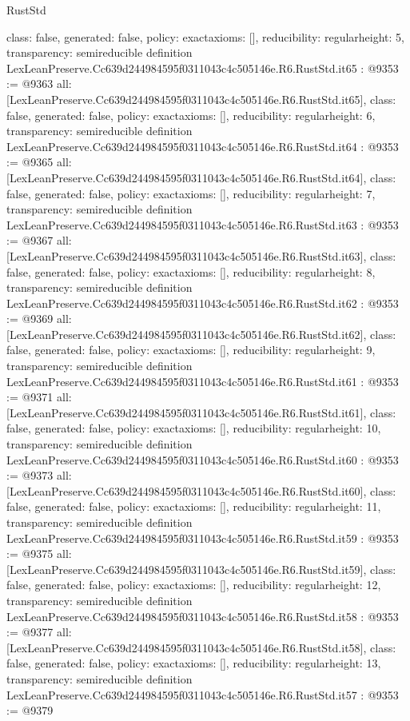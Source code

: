\begin{lexlean}{RustStd}
\begin{coremodule}
{  class: false,
  generated: false,
  policy: exact{axioms: []},
  reducibility: regular{height: 5},
  transparency: semireducible
}
definition LexLeanPreserve.Cc639d244984595f0311043c4c505146e.R6.RustStd.it65 : @9353 := @9363 {
  all: [LexLeanPreserve.Cc639d244984595f0311043c4c505146e.R6.RustStd.it65],
  class: false,
  generated: false,
  policy: exact{axioms: []},
  reducibility: regular{height: 6},
  transparency: semireducible
}
definition LexLeanPreserve.Cc639d244984595f0311043c4c505146e.R6.RustStd.it64 : @9353 := @9365 {
  all: [LexLeanPreserve.Cc639d244984595f0311043c4c505146e.R6.RustStd.it64],
  class: false,
  generated: false,
  policy: exact{axioms: []},
  reducibility: regular{height: 7},
  transparency: semireducible
}
definition LexLeanPreserve.Cc639d244984595f0311043c4c505146e.R6.RustStd.it63 : @9353 := @9367 {
  all: [LexLeanPreserve.Cc639d244984595f0311043c4c505146e.R6.RustStd.it63],
  class: false,
  generated: false,
  policy: exact{axioms: []},
  reducibility: regular{height: 8},
  transparency: semireducible
}
definition LexLeanPreserve.Cc639d244984595f0311043c4c505146e.R6.RustStd.it62 : @9353 := @9369 {
  all: [LexLeanPreserve.Cc639d244984595f0311043c4c505146e.R6.RustStd.it62],
  class: false,
  generated: false,
  policy: exact{axioms: []},
  reducibility: regular{height: 9},
  transparency: semireducible
}
definition LexLeanPreserve.Cc639d244984595f0311043c4c505146e.R6.RustStd.it61 : @9353 := @9371 {
  all: [LexLeanPreserve.Cc639d244984595f0311043c4c505146e.R6.RustStd.it61],
  class: false,
  generated: false,
  policy: exact{axioms: []},
  reducibility: regular{height: 10},
  transparency: semireducible
}
definition LexLeanPreserve.Cc639d244984595f0311043c4c505146e.R6.RustStd.it60 : @9353 := @9373 {
  all: [LexLeanPreserve.Cc639d244984595f0311043c4c505146e.R6.RustStd.it60],
  class: false,
  generated: false,
  policy: exact{axioms: []},
  reducibility: regular{height: 11},
  transparency: semireducible
}
definition LexLeanPreserve.Cc639d244984595f0311043c4c505146e.R6.RustStd.it59 : @9353 := @9375 {
  all: [LexLeanPreserve.Cc639d244984595f0311043c4c505146e.R6.RustStd.it59],
  class: false,
  generated: false,
  policy: exact{axioms: []},
  reducibility: regular{height: 12},
  transparency: semireducible
}
definition LexLeanPreserve.Cc639d244984595f0311043c4c505146e.R6.RustStd.it58 : @9353 := @9377 {
  all: [LexLeanPreserve.Cc639d244984595f0311043c4c505146e.R6.RustStd.it58],
  class: false,
  generated: false,
  policy: exact{axioms: []},
  reducibility: regular{height: 13},
  transparency: semireducible
}
definition LexLeanPreserve.Cc639d244984595f0311043c4c505146e.R6.RustStd.it57 : @9353 := @9379 {
}
\end{coremodule}
\end{lexlean}
